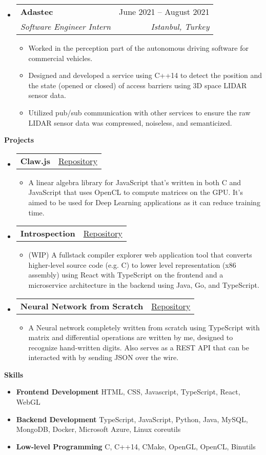 \documentclass[letterpaper,12pt]{article}[leftmargin=*]
\makeatletter
\def \entryspacing {-0pt}
\renewcommand{\section}[2]{\vspace{5pt}
  \colorbox{secondary}{\color{white}\raggedbottom\normalsize\textbf{{#1}{\hspace{7pt}#2}}}
}
\newcommand{\resumeEntryStart}{\begin{itemize}[leftmargin=2.5mm]}
\newcommand{\resumeEntryEnd}{\end{itemize}\vspace{\entryspacing}}
\newcommand{\resumeItemListStart}{\begin{itemize}[leftmargin=4.5mm]}
\newcommand{\resumeItemListEnd}{\end{itemize}}
\newcommand{\resumeItem}[1]{
  \item\small{
    {#1 \vspace{-2pt}}
  }
}
\newcommand{\resumeEntryTSDL}[4]{
  \vspace{-1pt}\item[]
    \begin{tabularx}{0.97\textwidth}{X@{\hspace{60pt}}r}
      \textbf{\color{primary}#1} & {\firabook\color{accent}\small#2} \\
      \textit{\color{accent}\small#3} & \textit{\color{accent}\small#4} \\
    \end{tabularx}\vspace{-6pt}
}
\newcommand{\resumeEntryTD}[2]{
  \vspace{-1pt}\item[]
    \begin{tabularx}{0.97\textwidth}{X@{\hspace{60pt}}r}
      \textbf{\color{primary}#1} & {\firabook\color{accent}\small#2} \\
    \end{tabularx}\vspace{-6pt}
}
\newcommand{\resumeEntryS}[2]{
  \item[]\small{
    \textbf{\color{primary}#1 }{ #2 \vspace{-6pt}}
  }
}
\makeatother
\begin{document}
  \resumeEntryStart
    \resumeEntryTSDL
      {Adastec}{June 2021 -- August 2021}
      {Software Engineer Intern}{Istanbul, Turkey}
    \resumeItemListStart
      \resumeItem {Worked in the perception part of the autonomous driving software for commercial vehicles.}
      \resumeItem {Designed and developed a service using C++14 to detect the position and the state (opened or closed) of access barriers using 3D space LIDAR sensor data.}
      \resumeItem {Utilized pub/sub communication with other services to ensure the raw LIDAR sensor data was compressed, noiseless, and semanticized.}
    \resumeItemListEnd
  \resumeEntryEnd


\section{\faFlask}{Projects}

  \resumeEntryStart
    \resumeEntryTD
      {Claw.js}{\href{https://github.com/tussoftwaredesign/claw-js}{Repository}}
    \resumeItemListStart
      \resumeItem {A linear algebra library for JavaScript that's written in both C and JavaScript that uses OpenCL to compute matrices on the GPU. It's aimed to be used for Deep Learning applications as it can reduce training time.}
    \resumeItemListEnd
  \resumeEntryEnd

  \resumeEntryStart
    \resumeEntryTD
      {Introspection}{\href{https://github.com/yvesyil/introspection}{Repository}}
    \resumeItemListStart
      \resumeItem {(WIP) A fullstack compiler explorer web application tool that converts higher-level source code (e.g. C) to lower level representation (x86 assembly) using React with TypeScript on the frontend and a microservice architecture in the backend using Java, Go, and TypeScript.}
    \resumeItemListEnd
  \resumeEntryEnd

  \resumeEntryStart
    \resumeEntryTD
      {Neural Network from Scratch}{\href{https://github.com/yvesyil/neural-net-api}{Repository}}
    \resumeItemListStart
      \resumeItem {A Neural network completely written from scratch using TypeScript with matrix and differential operations are written by me, designed to recognize hand-written digits. Also serves as a REST API that can be interacted with by sending JSON over the wire.}
    \resumeItemListEnd
  \resumeEntryEnd

\section{\faGears}{Skills}
 \resumeEntryStart
  \resumeEntryS{Frontend Development} {HTML, CSS, Javascript, TypeScript, React, WebGL}
  \resumeEntryS{Backend Development} {TypeScript, JavaScript, Python, Java, MySQL, MongoDB, Docker, Microsoft Azure, Linux coreutils}
  \resumeEntryS{Low-level Programming} {C, C++14, CMake, OpenGL, OpenCL, Binutils}
 \resumeEntryEnd
\end{document}
